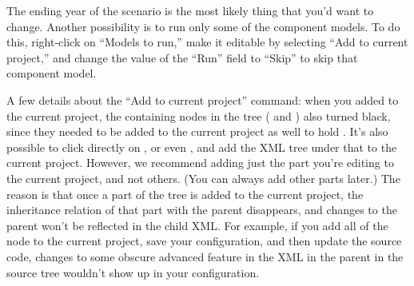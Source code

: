 The ending year of the scenario is the most likely thing that you'd want to
change.  Another possibility is to run only some of the component models.
To do this, right-click on ``Models to run,'' make it editable by
selecting ``Add to current project,'' and change the value of the ``Run''
field to ``Skip'' to skip that component model.

A few details about the ``Add to current project'' command: when you added
 to the current project, the containing nodes in the tree
( and ) also turned black, since
they needed to be added to the current project as well to hold
.  It's also possible to click directly on
, or even , and add the XML tree
under that to the current project.  However, we recommend adding just the
part you're editing to the current project, and not others.  (You can
always add other parts later.)  The reason is that once a part of the tree
is added to the current project, the inheritance relation of that part with
the parent disappears, and changes to the parent won't be reflected in the
child XML\@.  For example, if you add all of the 
node to the current project, save your configuration, and then update the
source code, changes to some obscure advanced feature in the XML in the
parent in the source tree wouldn't show up in your configuration.
